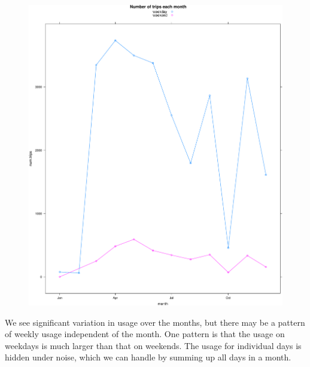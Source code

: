 \documentclass[]{article}
\begin{document}
\begin{figure}[htbp]
\centering
\includegraphics{velopassBirdsEye_files/figure-latex/tripsbymonth-1.pdf}
\caption{}
\end{figure}

We see significant variation in usage over the months, but there may be
a pattern of weekly usage independent of the month. One pattern is that
the usage on weekdays is much larger than that on weekends. The usage
for individual days is hidden under noise, which we can handle by
summing up all days in a month.
\end{document}
